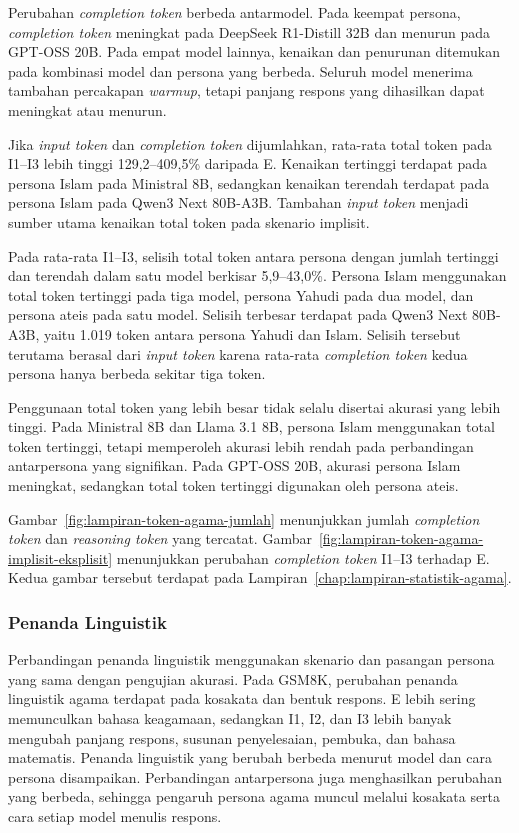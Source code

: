 Perubahan \textit{completion token} berbeda antarmodel. Pada keempat persona,
\textit{completion token} meningkat pada DeepSeek R1-Distill 32B dan menurun
pada GPT-OSS 20B. Pada empat model lainnya, kenaikan dan penurunan ditemukan
pada kombinasi model dan persona yang berbeda.
Seluruh model menerima tambahan percakapan \textit{warmup}, tetapi panjang
respons yang dihasilkan dapat meningkat atau menurun.

Jika \textit{input token} dan \textit{completion token} dijumlahkan, rata-rata
total token pada I1--I3 lebih tinggi 129,2--409,5\% daripada E. Kenaikan
tertinggi terdapat pada persona Islam pada Ministral 8B, sedangkan kenaikan
terendah terdapat pada persona Islam pada Qwen3 Next 80B-A3B. Tambahan
\textit{input token} menjadi sumber utama kenaikan total token pada skenario
implisit.

Pada rata-rata I1--I3, selisih total token antara persona dengan jumlah
tertinggi dan terendah dalam satu model berkisar 5,9--43,0\%. Persona Islam
menggunakan total token tertinggi pada tiga model, persona Yahudi pada dua
model, dan persona ateis pada satu model. Selisih terbesar terdapat pada Qwen3
Next 80B-A3B, yaitu 1.019 token antara persona Yahudi dan Islam. Selisih
tersebut terutama berasal dari \textit{input token} karena rata-rata
\textit{completion token} kedua persona hanya berbeda sekitar tiga token.

Penggunaan total token yang lebih besar tidak selalu disertai akurasi yang
lebih tinggi. Pada Ministral 8B dan Llama 3.1 8B, persona Islam menggunakan
total token tertinggi, tetapi memperoleh akurasi lebih rendah pada perbandingan
antarpersona yang signifikan. Pada GPT-OSS 20B, akurasi persona Islam meningkat,
sedangkan total token tertinggi digunakan oleh persona ateis.

Gambar~\ref{fig:lampiran-token-agama-jumlah} menunjukkan jumlah
\textit{completion token} dan \textit{reasoning token} yang tercatat.
Gambar~\ref{fig:lampiran-token-agama-implisit-eksplisit} menunjukkan perubahan
\textit{completion token} I1--I3 terhadap E. Kedua gambar tersebut terdapat
pada Lampiran~\ref{chap:lampiran-statistik-agama}.

\subsubsection{Penanda Linguistik}
\label{subsubsec:penanda-agama-gsm8k}

Perbandingan penanda linguistik menggunakan skenario dan pasangan persona yang
sama dengan pengujian akurasi. Pada GSM8K, perubahan penanda linguistik agama
terdapat pada kosakata dan bentuk respons. E lebih sering memunculkan bahasa
keagamaan, sedangkan I1, I2, dan I3 lebih banyak mengubah panjang respons,
susunan penyelesaian, pembuka, dan bahasa matematis. Penanda linguistik yang berubah
berbeda menurut model dan cara persona disampaikan. Perbandingan antarpersona
juga menghasilkan perubahan yang berbeda, sehingga pengaruh
persona agama muncul melalui kosakata serta cara setiap model menulis respons.

